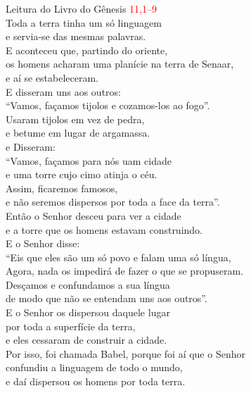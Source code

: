 \documentclass{book}
\begin{document}
\begin{flushleft}

    \vspace{0.2cm}
    Leitura do Livro do Gênesis
    \hspace{\fill}
    \textcolor{red}{11,1--9}
    \vspace{0.2cm} \\
    Toda a terra tinha um só linguagem \\
    e servia-se das mesmas palavras. \\
    E aconteceu que, partindo do oriente, \\
    os homens acharam uma planície na terra de Senaar, \\
    e aí se estabeleceram. \\
    E disseram uns aos outros: \\
    ``Vamos, façamos tijolos e cozamos-los ao fogo''. \\
    Usaram tijolos em vez de pedra, \\
    e betume em lugar de argamassa. \\
    e Disseram: \\
    ``Vamos, façamos para nós uam cidade \\
    e uma torre cujo cimo atinja o céu. \\
    Assim, ficaremos famosos, \\
    e não seremos dispersos por toda a face da terra''. \\
    Então o Senhor desceu para ver a cidade \\
    e a torre que os homens estavam construindo. \\
    E o Senhor disse: \\
    ``Eis que eles são um só povo e falam uma só língua, \\
    Agora, nada os impedirá de fazer o que se propuseram. \\
    Desçamos e confundamos a sua língua \\
    de modo que não se entendam uns aos outros''. \\
    E o Senhor os dispersou daquele lugar \\
    por toda a superfície da terra, \\
    e eles cessaram de construir a cidade. \\
    Por isso, foi chamada Babel, porque foi aí que o Senhor \\
    confundiu a linguagem de todo o mundo, \\
    e daí dispersou os homens por toda terra.

\end{flushleft}
\end{document}
